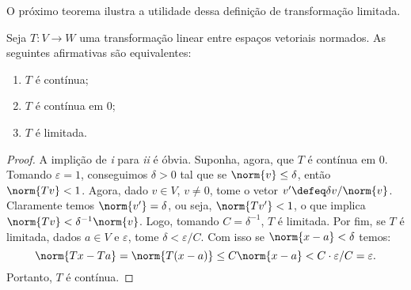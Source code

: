 O próximo teorema ilustra a utilidade dessa definição de transformação limitada.

\begin{teo}
    Seja \( T : V \to W \) uma transformação linear entre espaços vetoriais normados.
    As seguintes afirmativas são equivalentes:
    \begin{enumerate}[label=\roman*)]
        \item \( T \) é contínua;
        \item \( T \) é contínua em \( 0 \);
        \item \( T \) é limitada.
    \end{enumerate}
\end{teo}
\begin{proof}
    A implição de \emph{i} para \emph{ii} é óbvia.
    Suponha, agora, que \( T \) é contínua em \( 0 \).
    Tomando \( \varepsilon = 1 \), conseguimos \( \delta > 0 \) tal que se \( \norm{ v } \leq \delta \), então \( \norm{ Tv } < 1 \).
    Agora, dado \( v \in V \), \( v \neq 0 \), tome o vetor \( v' \defeq \delta v / \norm{ v } \).
    Claramente temos \( \norm{ v' } = \delta \), ou seja, \( \norm{ Tv' } < 1 \), o que implica \( \norm{ Tv } < \delta^{ -1 } \norm{ v } \).
    Logo, tomando \( C = \delta^{ -1 } \), \( T \) é limitada.
    Por fim, se \( T \) é limitada, dados \( a \in V \) e \( \varepsilon \), tome \( \delta < \varepsilon/C \).
    Com isso se \( \norm{ x - a } < \delta \) temos: \[
        \norm{ Tx - Ta } = \norm{ T(x - a) } \leq C \norm{ x - a } < C \cdot \varepsilon/C = \varepsilon
    .\]
    Portanto, \( T \) é contínua.
\end{proof}

